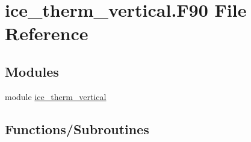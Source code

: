 \hypertarget{ice__therm__vertical_8F90}{
\section{ice\_\-therm\_\-vertical.F90 File Reference}
\label{ice__therm__vertical_8F90}
}
\subsection*{Modules}
\begin{DoxyCompactItemize}
\item 
module \hyperlink{namespaceice__therm__vertical}{ice\_\-therm\_\-vertical}
\end{DoxyCompactItemize}
\subsection*{Functions/Subroutines}
